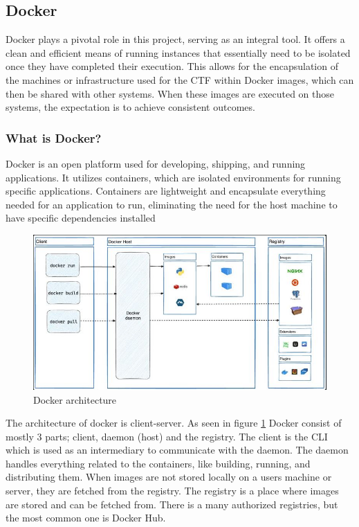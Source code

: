 \subsection{Docker}
\label{sec:docker}
Docker plays a pivotal role in this project, serving as an integral tool. 
It offers a clean and efficient means of running instances that essentially 
need to be isolated once they have completed their execution. 
This allows for the encapsulation of the machines or infrastructure used for the \ac{CTF} within Docker images, 
which can then be shared with other systems. When these images are executed on those systems, the expectation is to achieve consistent outcomes.

\subsubsection{What is Docker?}
Docker\cite{docker-docs} is an open platform used for developing, shipping, and running applications. 
It utilizes containers, which are isolated environments for running specific applications. 
Containers are lightweight and encapsulate everything needed for an application to run, 
eliminating the need for the host machine to have specific dependencies installed

\begin{figure}[h]
    \includegraphics[scale=.7]{images/Docker-architecture.jpg}
    \caption{Docker architecture\cite{docker-docs}}
    \label{fig:docker_architecture}
\end{figure}

The architecture of docker is client-server. 
As seen in figure \ref{fig:docker_architecture} Docker consist of mostly 3 parts; client, daemon (host) and the registry.
The client is the \ac{CLI} which is used as an intermediary to communicate with the daemon. 
The daemon handles everything related to the containers, like building, running, and distributing them.
When images are not stored locally on a users machine or server, they are fetched from the registry.
The registry is a place where images are stored and can be fetched from. There is a many 
authorized registries, but the most common one is Docker Hub.\cite{dockerhub}\\
